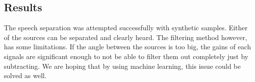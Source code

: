 \newpage
\subsection*{Results} 
The speech separation was attempted successfully with synthetic samples. Either of 
the sources can be separated and clearly heard. The filtering method however, has 
some limitations. If the angle between the sources is too big, the gains of each 
signals are significant enough to not be able to filter them out completely just 
by subtracting. We are hoping that by using machine learning, this issue could be 
solved as well.